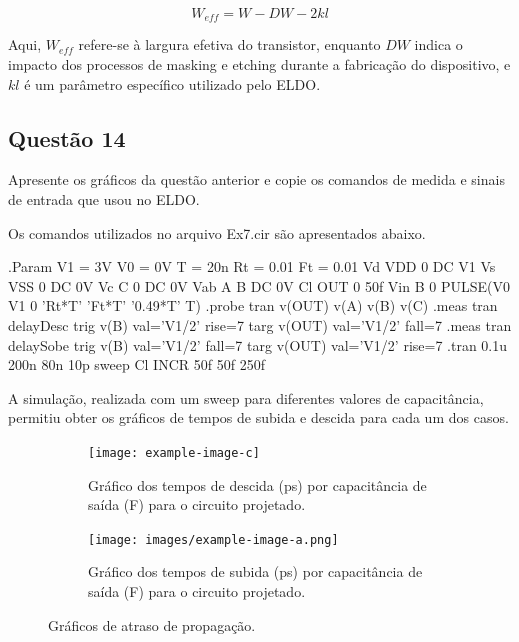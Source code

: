 \documentclass[12pt,a4paper]{article}
\begin{document}
$$
W_{eff} = W - DW - 2kl
$$

Aqui, $W_{eff}$ refere-se à largura efetiva do transistor, enquanto $DW$ indica o impacto dos processos de masking e etching durante a fabricação do dispositivo, e $kl$ é um parâmetro específico utilizado pelo ELDO.

\subsection*{Questão 14}

Apresente os gráficos da questão anterior e copie os comandos de medida e sinais de entrada que usou no ELDO.

Os comandos utilizados no arquivo Ex7.cir são apresentados abaixo.

\begin{codeblock}[title={Comandos ELDO}, label={lst:eldo_commands}, listing options={language=TeX}]
.Param V1 = 3V V0 = 0V T = 20n Rt = 0.01 Ft = 0.01
Vd VDD 0 DC V1
Vs VSS 0 DC 0V
Vc C 0 DC 0V
Vab A B DC 0V
Cl OUT 0 50f
Vin B 0 PULSE(V0 V1 0 'Rt*T' 'Ft*T' '0.49*T' T)
.probe tran v(OUT) v(A) v(B) v(C)
.meas tran delayDesc trig v(B) val='V1/2' rise=7 targ v(OUT) val='V1/2'
fall=7
.meas tran delaySobe trig v(B) val='V1/2' fall=7 targ v(OUT) val='V1/2'
rise=7
.tran 0.1u 200n 80n 10p sweep Cl INCR 50f 50f 250f
\end{codeblock}

A simulação, realizada com um sweep para diferentes valores de capacitância, permitiu obter os gráficos de tempos de subida e descida para cada um dos casos.

\begin{figure}[H]
    \centering
    \begin{subfigure}[b]{0.48\textwidth}
        \texttt{[image: example-image-c]}
        \caption{Gráfico dos tempos de descida (ps) por capacitância de saída (F) para o circuito projetado.}
        \label{fig:delay_descida}
    \end{subfigure}
    \hfill
    \begin{subfigure}[b]{0.48\textwidth}
        \texttt{[image: images/example-image-a.png]}
        \caption{Gráfico dos tempos de subida (ps) por capacitância de saída (F) para o circuito projetado.}
        \label{fig:delay_subida}
    \end{subfigure}
    \caption{Gráficos de atraso de propagação.}
    \label{fig:delay_graphs}
\end{figure}
\end{document}
